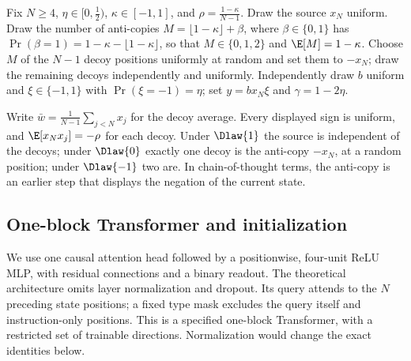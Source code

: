 \begin{definition}
\label{def:Dkappa}
Fix $N\ge4$, $\eta\in[0,\tfrac{1}{2})$, $\kappa\in[-1,1]$, and $\rho=\tfrac{1-\kappa}{N-1}$.
Draw the source $x_N$ uniform. Draw the number of anti-copies $M=\lfloor1-\kappa\rfloor+\beta$, where
$\beta\in\{0,1\}$ has $\Pr(\beta=1)=1-\kappa-\lfloor1-\kappa\rfloor$, so that $M\in\{0,1,2\}$ and $\E[M]=1-\kappa$.
Choose $M$ of the $N-1$ decoy positions uniformly at random and set them to $-x_N$; draw the remaining decoys independently and uniformly.
Independently draw $b$ uniform and $\xi\in\{-1,1\}$ with $\Pr(\xi=-1)=\eta$;
set $y=b x_N \xi$ and $\gamma=1-2\eta$.
\end{definition}
Write $\bar w=\tfrac{1}{N-1}\sum_{j<N}x_j$ for the decoy average.
Every displayed sign is uniform, and $\E[x_N x_j]=-\rho$ for each decoy.
Under $\Dlaw{1}$ the source is independent of the decoys; under $\Dlaw{0}$ exactly one decoy is the anti-copy $-x_N$, at a random position;
under $\Dlaw{-1}$ two are. In chain-of-thought terms, the anti-copy is an earlier step that displays the negation of the current state.

\subsection{One-block Transformer and initialization}
\label{sec:architecture}
We use one causal attention head followed by a positionwise, four-unit ReLU MLP, with residual connections and a binary readout.
The theoretical architecture omits layer normalization and dropout. Its query attends to the $N$ preceding state positions;
a fixed type mask excludes the query itself and instruction-only positions. This is a specified one-block Transformer,
with a restricted set of trainable directions. Normalization would change the exact identities below.

